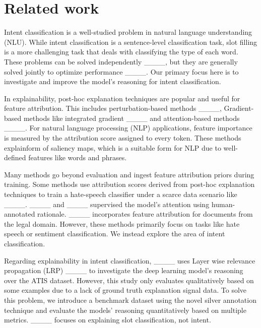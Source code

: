 \section{Related work}
Intent classification is a well-studied problem in natural language understanding (NLU). While intent classification is a sentence-level classification task, slot filling is a more challenging task that deals with classifying the type of each word. These problems can be solved independently ____, but they are generally solved jointly to optimize performance ____. Our primary focus here is to investigate and improve the model's reasoning for intent classification.

In explainability, post-hoc explanation techniques are popular and useful for feature attribution. This includes perturbation-based methods ____, Gradient-based methods like integrated gradient ____ and attention-based methods ____. For natural language processing (NLP) applications, feature importance is measured by the attribution score assigned to every token. These methods explainform of saliency maps, which is a suitable form for NLP due to well-defined features like words and phrases.

Many methods go beyond evaluation and ingest feature attribution priors during training. Some methods use attribution scores derived from post-hoc explanation techniques to train a hate-speech classifier under a scarce data scenario like ____. ____ and ____ supervised the model's attention using human-annotated rationale. ____ incorporates feature attribution for documents from the legal domain. However, these methods primarily focus on tasks like hate speech or sentiment classification. We instead explore the area of intent classification.

Regarding explainability in intent classification, ____ uses Layer wise relevance propagation (LRP) ____ to investigate the deep learning model's reasoning over the ATIS dataset. However, this study only evaluates qualitatively based on some examples due to a lack of ground truth explanation signal data. To solve this problem, we introduce a benchmark dataset using the novel silver annotation technique and evaluate the models' reasoning quantitatively based on multiple metrics. ____ focuses on explaining slot classification, not intent.